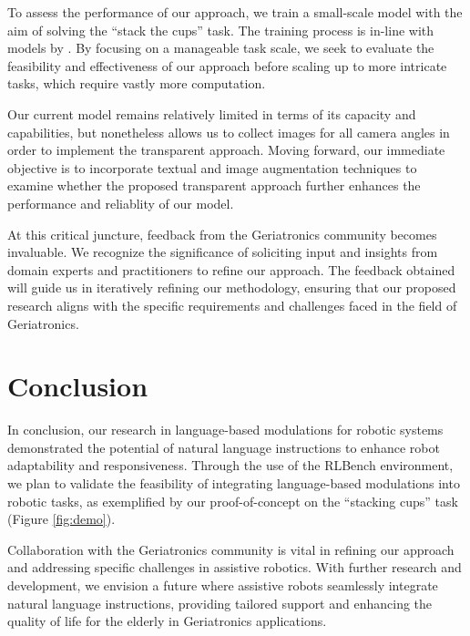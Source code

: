 \documentclass[journal]{IEEEtran}
\begin{document}
To assess the performance of our approach, we train a small-scale model with the aim of
solving the ``stack the cups'' task. The training process is in-line with models by \cite{james2020rlbench}. 
By focusing on a manageable task scale, we seek to evaluate the feasibility and 
effectiveness of our approach before scaling up to more intricate tasks, which
require vastly more computation.

Our current model remains relatively limited in terms of its capacity and capabilities, but
nonetheless allows us to collect images for all camera angles in order to implement the 
transparent approach. Moving forward, our immediate objective is to incorporate textual 
and image augmentation techniques to examine whether the proposed transparent approach further 
enhances the performance and reliablity of our model. 

At this critical juncture, feedback from the Geriatronics community becomes invaluable. 
We recognize the significance of soliciting input and insights from domain experts and
practitioners to refine our approach. The feedback obtained will guide us in iteratively
refining our methodology, ensuring that our proposed research aligns with the specific requirements
and challenges faced in the field of Geriatronics.

\section{Conclusion}

In conclusion, our research in language-based modulations for robotic systems 
demonstrated the potential of natural language instructions to enhance robot adaptability
and responsiveness. Through the use of the RLBench environment, we plan to validate the feasibility 
of integrating language-based modulations into robotic tasks, as exemplified by our proof-of-concept on 
the ``stacking cups'' task (Figure \ref{fig:demo}).

Collaboration with the Geriatronics community is vital in refining our approach and
addressing specific challenges in assistive robotics. With further research and 
development, we envision a future where assistive robots seamlessly integrate natural
language instructions, providing tailored support and enhancing the quality of life
for the elderly in Geriatronics applications.
\end{document}
